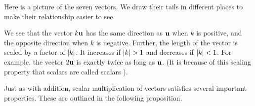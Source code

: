 \begin{solution}
  Here is a picture of the seven vectors. We draw their tails in
  different places to make their relationship easier to see.
  \begin{center}
  \end{center}
  We see that the vector $k\vect{u}$ has the same direction as
  $\vect{u}$ when $k$ is positive, and the opposite direction when $k$
  is negative. Further, the length of the vector is scaled by a factor
  of $\left|k\right|$. It increases if $\abs{k}>1$ and decreases if
  $\left|k\right|<1$. For example, the vector $2\vect{u}$ is exactly twice as
  long as $\vect{u}$.  (It is because of this scaling property that
  scalars are called scalars%
  ).
\end{solution}

Just as with addition, scalar multiplication of vectors satisfies
several important properties. These are outlined in the following
proposition.

